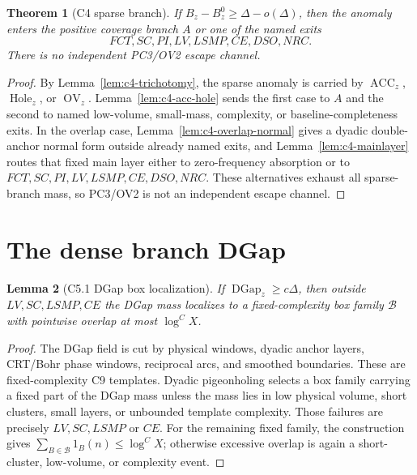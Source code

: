 \documentclass[11pt]{article}
\newtheorem{theorem}{Theorem}[section]
\newtheorem{lemma}[theorem]{Lemma}
\theoremstyle{definition}
\newcommand{\ACC}{\operatorname{ACC}}
\newcommand{\Hole}{\operatorname{Hole}}
\newcommand{\OV}{\operatorname{OV}}
\newcommand{\DGap}{\operatorname{DGap}}
\begin{document}
\begin{theorem}[C4 sparse branch]\label{thm:c4}
If $B_z-B_z^0\ge\Delta-o(\Delta)$, then the anomaly enters the positive coverage branch $A$ or one of the named exits
\[
  FCT,SC,PI,LV,LSMP,CE,DSO,NRC.
\]
There is no independent PC3/OV2 escape channel.
\end{theorem}
\begin{proof}
By Lemma~\ref{lem:c4-trichotomy}, the sparse anomaly is carried by $\ACC_z$, $\Hole_z$, or $\OV_z$.  Lemma~\ref{lem:c4-acc-hole} sends the first case to $A$ and the second to named low-volume, small-mass, complexity, or baseline-completeness exits.  In the overlap case, Lemma~\ref{lem:c4-overlap-normal} gives a dyadic double-anchor normal form outside already named exits, and Lemma~\ref{lem:c4-mainlayer} routes that fixed main layer either to zero-frequency absorption or to $FCT,SC,PI,LV,LSMP,CE,DSO,NRC$.  These alternatives exhaust all sparse-branch mass, so PC3/OV2 is not an independent escape channel.
\end{proof}

\section{The dense branch DGap}\label{sec:dense}
\begin{lemma}[C5.1 DGap box localization]\label{lem:c5-box}
If $\DGap_z\ge c\Delta$, then outside $LV,SC,LSMP,CE$ the DGap mass localizes to a fixed-complexity box family $\mathcal B$ with pointwise overlap at most $\log^C X$.
\end{lemma}
\begin{proof}
The DGap field is cut by physical windows, dyadic anchor layers, CRT/Bohr phase windows, reciprocal arcs, and smoothed boundaries.  These are fixed-complexity C9 templates.  Dyadic pigeonholing selects a box family carrying a fixed part of the DGap mass unless the mass lies in low physical volume, short clusters, small layers, or unbounded template complexity.  Those failures are precisely $LV,SC,LSMP$ or $CE$.  For the remaining fixed family, the construction gives $\sum_{B\in\mathcal B}1_B(n)\le\log^C X$; otherwise excessive overlap is again a short-cluster, low-volume, or complexity event.
\end{proof}
\end{document}

